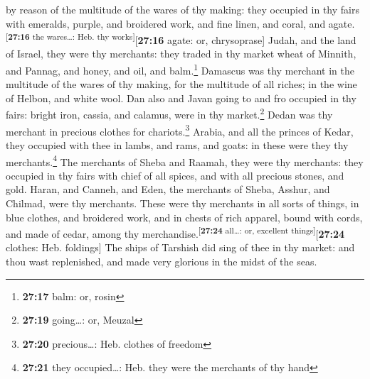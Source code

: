 by reason of the multitude of the wares of thy making: they occupied in
thy fairs with emeralds, purple, and broidered work, and fine linen, and
coral, and agate.\textsuperscript{{[}\textbf{27:16} the wares\ldots:
Heb. thy works{]}}{[}\textbf{27:16} agate: or, chrysoprase{]}
 Judah, and the land of Israel, they were thy merchants:
they traded in thy market wheat of Minnith, and Pannag, and honey, and
oil, and balm.\footnote{\textbf{27:17} balm: or, rosin} 
Damascus was thy merchant in the multitude of the wares of thy making,
for the multitude of all riches; in the wine of Helbon, and white wool.
 Dan also and Javan going to and fro occupied in thy
fairs: bright iron, cassia, and calamus, were in thy market.\footnote{\textbf{27:19}
  going\ldots: or, Meuzal}  Dedan was thy merchant in
precious clothes for chariots.\footnote{\textbf{27:20} precious\ldots:
  Heb. clothes of freedom}  Arabia, and all the princes
of Kedar, they occupied with thee in lambs, and rams, and goats: in
these were they thy merchants.\footnote{\textbf{27:21} they
  occupied\ldots: Heb. they were the merchants of thy hand}
 The merchants of Sheba and Raamah, they were thy
merchants: they occupied in thy fairs with chief of all spices, and with
all precious stones, and gold.  Haran, and Canneh, and
Eden, the merchants of Sheba, Asshur, and Chilmad, were thy merchants.
 These were thy merchants in all sorts of things, in blue
clothes, and broidered work, and in chests of rich apparel, bound with
cords, and made of cedar, among thy
merchandise.\textsuperscript{{[}\textbf{27:24} all\ldots: or, excellent
things{]}}{[}\textbf{27:24} clothes: Heb. foldings{]} 
The ships of Tarshish did sing of thee in thy market: and thou wast
replenished, and made very glorious in the midst of the seas.

